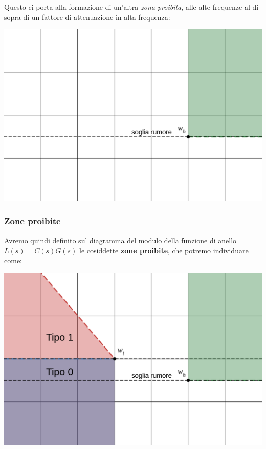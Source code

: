 \documentclass[a4paper,11pt]{article}
\begin{document}
\noindent
\begin{minipage}{\textwidth}

	Questo ci porta alla formazione di un'altra \textit{zona proibita}, alle alte frequenze al di sopra di un fattore di attenuazione in alta frequenza:
	\begin{center}
		\includegraphics[scale=0.28]{../figures/loop_shaping_higher.png}
	\end{center}

\end{minipage}

\subsubsection{Zone proibite}
Avremo quindi definito sul diagramma del modulo della funzione di anello $L(s) = C(s) G(s)$ le cosiddette \textbf{zone proibite}, che potremo individuare come:
\begin{center}
	\includegraphics[scale=0.28]{../figures/loop_shaping_full.png}
\end{center}
\end{document}
